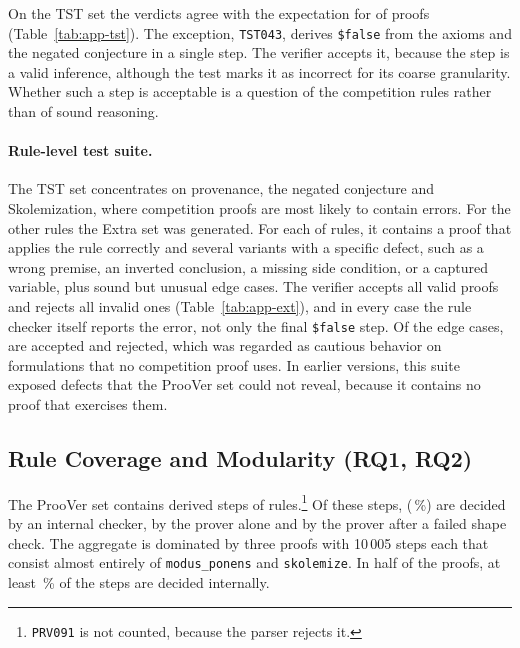 \begin{table}[!htb]
\centering
\small
\caption{Verdicts on the \EvalOffN{} pairs of the ProoVer set and resulting score. The last row also includes the \EvalSampleN{} deprecated proofs.}
\label{tab:eval-matrix}

\end{table}

On the TST set the verdicts agree with the expectation for \EvalTstAgree{} of \EvalTstTotal{} proofs (Table~\ref{tab:app-tst}).
The exception, \texttt{TST043}, derives \texttt{\$false} from the axioms and the negated conjecture in a single step.
The verifier accepts it, because the step is a valid inference, although the test marks it as incorrect for its coarse granularity.
Whether such a step is acceptable is a question of the competition rules rather than of sound reasoning.

\paragraph{Rule-level test suite.}
\label{subsec:eval-extra}

The TST set concentrates on provenance, the negated conjecture and Skolemization, where competition proofs are most likely to contain errors.
For the other rules the Extra set was generated. For each of \EvalExtraRules{} rules, it contains a proof that applies the rule correctly and several variants with a specific defect, such as a wrong premise, an inverted conclusion, a missing side condition, or a captured variable, plus \EvalExtraEdge{} sound but unusual edge cases.
The verifier accepts all \EvalExtraAccOk{} valid proofs and rejects all \EvalExtraRejOk{} invalid ones (Table~\ref{tab:app-ext}), and in every case the rule checker itself reports the error, not only the final \texttt{\$false} step.
Of the edge cases, \EvalExtraEdgeAcc{} are accepted and \EvalExtraEdgeRej{} rejected, which was regarded as cautious behavior on formulations that no competition proof uses.
In earlier versions, this suite exposed defects that the ProoVer set could not reveal, because it contains no proof that exercises them.

\subsection{Rule Coverage and Modularity (RQ1, RQ2)}
\label{subsec:eval-coverage}

The ProoVer set contains \EvalDerivedSteps{} derived steps of \EvalRulesInSet{} rules.\footnote{\texttt{PRV091} is not counted, because the parser rejects it.}
Of these steps, \EvalInternalSteps{} (\EvalInternalPct\,\%) are decided by an internal checker, \EvalAtpOnlySteps{} by the prover alone and \EvalFallbackSteps{} by the prover after a failed shape check.
The aggregate is dominated by three proofs with 10\,005 steps each that consist almost entirely of \texttt{modus\_ponens} and \texttt{skolemize}. In half of the proofs, at least \EvalInternalMedianShare\,\% of the steps are decided internally.

